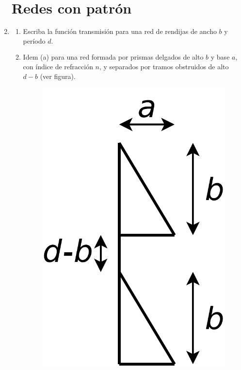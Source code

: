 \documentclass[11pt,spanish,a4paper]{article}
\begin{document}
\begin{enumerate}
\section*{Redes con patrón}

\item
\begin{enumerate}
\item Escriba la función transmisión para una red de rendijas de ancho $b$
y período $d$.
\item Idem (a) para una red formada por prismas delgados de alto $b$ y
base $a$, con índice de refracción $n$, y separados por tramos obstruidos
de alto $d-b$ (ver figura). 
\begin{figure}[H]
\centering{}\includegraphics[clip,scale=0.3]{ej5-44}
\end{figure}
\end{enumerate}



\end{enumerate}
\end{document}
